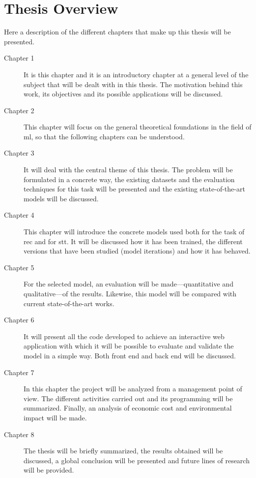 \section{Thesis Overview}

Here a description of the different chapters that make up this thesis will be
presented.

\begin{description}
  \item[Chapter 1] It is this chapter and it is an introductory chapter at a
  general level of the subject that will be dealt with in this thesis. The
  motivation behind this work, its objectives and its possible applications
  will be discussed. 
  \item[Chapter 2] This chapter will focus on the general theoretical
  foundations in the field of \gls{ml}, so that the following chapters can be
  understood. 
  \item[Chapter 3] It will deal with the central theme of this thesis. The
  problem will be formulated in a concrete way, the existing datasets and the
  evaluation techniques for this task will be presented and the existing
  state-of-the-art models will be discussed. 
  \item[Chapter 4] This chapter will introduce the concrete models used both
  for the task of \gls{rec} and for \gls{stt}. It will be discussed how it has
  been trained, the different versions that have been studied (model
  iterations) and how it has behaved. 
  \item[Chapter 5] For the selected model, an evaluation will be
  made---quantitative and qualitative---of the results. Likewise, this model
  will be compared with current state-of-the-art works. 
  \item[Chapter 6] It will present all the code developed to achieve an
  interactive web application with which it will be possible to evaluate and
  validate the model in a simple way. Both front end and back end will be
  discussed. 
  \item[Chapter 7] In this chapter the project will be analyzed from a
  management point of view. The different activities carried out and its
  programming will be summarized. Finally, an analysis of economic cost and
  environmental impact will be made. 
  \item[Chapter 8] The thesis will be briefly summarized, the results obtained
  will be discussed, a global conclusion will be presented and future lines of
  research will be provided. 
\end{description}

